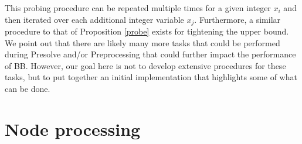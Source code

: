\documentclass[11.5pt]{article}
\begin{document}
This probing procedure can be repeated multiple times for a given integer $x_i$ and then iterated over each additional integer variable $x_j$. Furthermore, a similar procedure to that of Proposition \ref{probe} exists for tightening the upper bound. We point out that there are likely many more tasks that could be performed during Presolve and/or Preprocessing that could further impact the performance of BB. However, our goal here is not to develop extensive procedures for these tasks, but to put together an initial implementation that highlights some of what can be done.\\ %



\section{Node processing} \label{sec:np}
\end{document}
